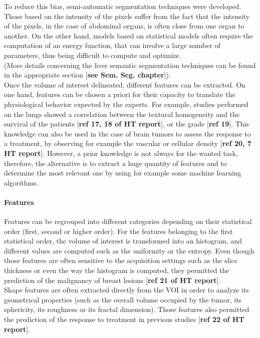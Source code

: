 \documentclass[]{article}
\let\oldparagraph\paragraph
\renewcommand{\paragraph}[1]{\oldparagraph{#1}\mbox{}}
\begin{document}
To reduce this bias, semi-automatic segmentation techniques were
developed. Those based on the intensity of the pixels suffer from the
fact that the intensity of the pixels, in the case of abdominal organs,
is often close from one organ to another. On the other hand, models
based on statistical models often require the computation of an energy
function, that can involve a large number of parameters, thus being
difficult to compute and optimize.\\
(More details concerning the liver semantic segmentation techniques can
be found in the appropriate section {[}\textbf{see Sem. Seg.
chapter}{]}).\\
Once the volume of interest delineated, different features can be
extracted. On one hand, features can be chosen a priori for their
capacity to translate the physiological behavior expected by the
experts. For example, studies performed on the lungs showed a
correlation between the textural homogeneity and the survival of the
patients {[}\textbf{ref 17, 18 of HT report}{]}, or the grade
{[}\textbf{ref 19}{]}. This knowledge can also be used in the case of
brain tumors to assess the response to a treatment, by observing for
example the vascular or cellular density {[}\textbf{ref 20, 7 HT
report}{]}. However, a prior knowledge is not always for the wanted
task, therefore, the alternative is to extract a huge quantity of
features and to determine the most relevant one by using for example
some machine learning algorithms.

\paragraph{Features}\label{features}

Features can be regrouped into different categories depending on their
statistical order (first, second or higher order). For the features
belonging to the first statistical order, the volume of interest is
transformed into an histogram, and different values are computed such as
the uniformity or the entropy. Even though those features are often
sensitive to the acquisition settings such as the slice thickness or
even the way the histogram is computed, they permitted the prediction of
the malignancy of breast lesions {[}\textbf{ref 21 of HT report}{]}.\\
Shape features are often extracted directly from the VOI in order to
analyze its geometrical properties (such as the overall volume occupied
by the tumor, its sphericity, its roughness or its fractal dimension).
Those features also permitted the prediction of the response to
treatment in previous studies {[}\textbf{ref 22 of HT report}{]}.
\end{document}
